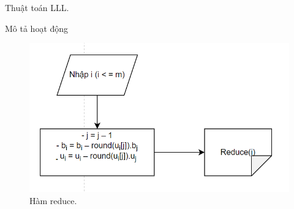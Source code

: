 \documentclass{beamer}
\numberwithin{equation}{section}
\begin{document}
\begin{frame}{Thuật toán LLL.}
 
    
\end{frame}
\begin{frame}{Mô tả   hoạt động}
 
    
 



\begin{figure}[h]
\centering
\includegraphics[scale = 0.6]{pictures/a.12.png}
\caption{Hàm reduce.}
\end{figure}

\end{frame}
\end{document}
